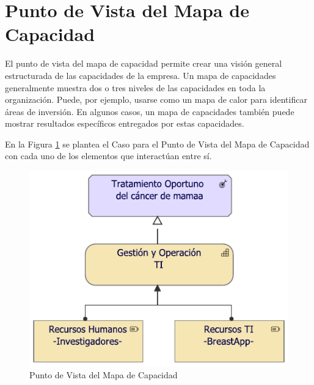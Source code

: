 \section{Punto de Vista del Mapa de Capacidad}

El punto de vista del mapa de capacidad permite crear una visión general estructurada de las capacidades de la empresa. Un mapa de capacidades generalmente muestra dos o tres niveles de las capacidades en toda la organización. Puede, por ejemplo, usarse como un mapa de calor para identificar áreas de inversión. En algunos casos, un mapa de capacidades también puede mostrar resultados específicos entregados por estas capacidades\cite{ArchiMate3.0.1}. 

En la Figura \ref{PvMapaCapacidad} se plantea el Caso para el Punto de Vista del Mapa de Capacidad con cada uno de los elementos que interactúan entre sí. 

\begin{figure}[h!]
	\centering
	\includegraphics[width=0.75\linewidth]{ARQUITECTURA/imgs/CapaEstrategica/2_PvMapaCapacidad}
	\caption{Punto de Vista del Mapa de Capacidad}
	\label{PvMapaCapacidad}
\end{figure}

